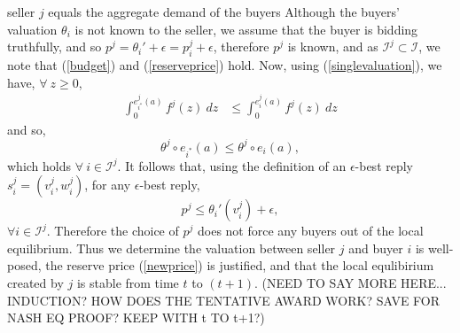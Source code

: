 \documentclass[12pt]{article}
\theoremstyle{definition}
\newcommand{\mcI}{\mathcal{I}}
\begin{document}
\begin{multicols}{2}
seller $j$ equals the aggregate demand of the buyers \cite{???}
Although the buyers' valuation $\theta_i$ is not known to the seller, we assume
that the buyer is bidding truthfully, and so $p^j = {\theta_i}' + \epsilon
=p_i^j + \epsilon$, therefore $p^j$ is known, and as $\mcI^j\subset \mcI$, we
note that (\ref{budget}) and (\ref{reserveprice}) hold. Now, using
(\ref{singlevaluation}), we have, $\forall \ z\ge 0$,
\begin{align*}
    \int_0^{e_{i^*}^{j}(a)} f^{j}(z)\ dz &\le\int_0^{e_i^{j}(a)}
f^{j}(z) \ dz 
\end{align*}
and so,
$$
    \theta^j\circ e_{i^*}(a) \le \theta^j\circ e_i(a),
$$
which holds $\forall \ i \in \mcI^j$.
It follows that, using
the definition of an $\epsilon$-best reply $s_i^j = (v_i^j, w_i^j)$,  
for any $\epsilon$-best reply, 
$$
    p^j \le {\theta_i}'(v_i^j) + \epsilon,
$$
$\forall i \in \mcI^j$.
Therefore the choice of $p^j$ does not force any buyers out of the local
equilibrium. Thus we determine the valuation between seller
$j$ and buyer $i$ is well-posed, the reserve price (\ref{newprice}) is justified, and that the local
equlibirium created by $j$ is stable from time $t$ to $(t+1)$. 
(NEED TO SAY MORE HERE... INDUCTION? HOW DOES THE TENTATIVE AWARD WORK? SAVE
FOR NASH EQ PROOF? KEEP WITH t TO t+1?)


\end{multicols}
\end{document}
